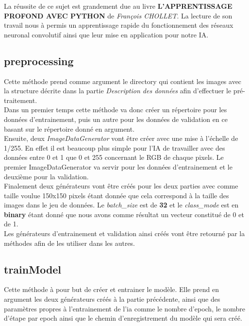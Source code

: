 \documentclass[12pt ,a4paper ]{article}
\begin{document}
\begin{multicols}{2}
La réussite de ce sujet est grandement due au livre \textbf{L'APPRENTISSAGE PROFOND AVEC PYTHON} de \textit{François CHOLLET}. La lecture de son travail nous à permis un apprentissage rapide du fonctionnement des réseaux neuronal convolutif ainsi que leur mise en application pour notre IA. 

\subsection{preprocessing}
Cette méthode prend comme argument le directory qui contient les images avec la structure décrite dans la partie \textit{Description des données} afin d'effectuer le pré-traitement. \\

Dans un premier temps cette méthode va donc créer un répertoire pour les données d'entrainement, puis un autre pour les données de validation en ce basant sur le répertoire donné en argument.\\

Ensuite, deux \textit{ImageDataGenerator} vont être créer avec une mise à l'échelle de 1/255. En effet il est beaucoup plus simple pour l'IA de travailler avec des données entre 0 et 1 que 0 et 255 concernant le RGB de chaque pixels. Le premier ImageDataGenerator va servir pour les données d'entrainement et le deuxième pour la validation.\\

Finalement deux générateurs vont être créés pour les deux parties avec comme taille voulue 150x150 pixels étant donnée que cela correspond à la taille des images dans le jeu de données. Le \textit{batch\_size} est de \textbf{32} et le \textit{class\_mode} est en \textbf{binary} étant donné que nous avons comme résultat un vecteur constitué de 0 et de 1.\\

Les générateurs d'entrainement et validation ainsi créés vont être retourné par la méthodes afin de les utiliser dans les autres. 

\subsection{trainModel}
Cette méthode à pour but de créer et entrainer le modèle. Elle prend en argument les deux générateurs créés à la partie précédente, ainsi que des paramètres propres à l’entrainement de l’ia comme le nombre d’epoch, le nombre d’étape par epoch ainsi que le chemin d’enregistrement du modèle qui sera créé.\\


\end{multicols}
\end{document}
